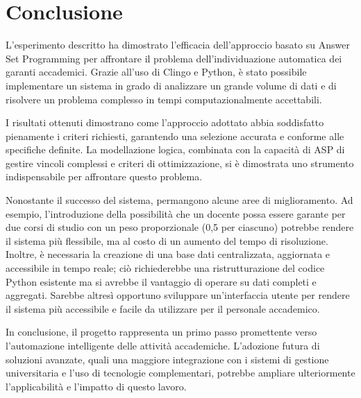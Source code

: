 \section{Conclusione}

L'esperimento descritto ha dimostrato l'efficacia dell'approccio basato su
Answer Set Programming per affrontare il problema
dell'individuazione automatica dei garanti accademici. Grazie all'uso di
Clingo e Python, è stato possibile implementare un sistema in
grado di analizzare un grande volume di dati e di risolvere un problema
complesso in tempi computazionalmente accettabili.

I risultati ottenuti dimostrano come l'approccio adottato abbia soddisfatto
pienamente i criteri richiesti, garantendo una selezione accurata e conforme
alle specifiche definite. La modellazione logica, combinata con la capacità di
ASP di gestire vincoli complessi e criteri di ottimizzazione, si è dimostrata
uno strumento indispensabile per affrontare questo problema.

Nonostante il successo del sistema, permangono alcune aree di miglioramento. Ad
esempio, l'introduzione della possibilità che un docente possa essere garante
per due corsi di studio con un peso proporzionale (0,5 per ciascuno) potrebbe
rendere il sistema più flessibile, ma al costo di un aumento del tempo di
risoluzione. Inoltre, è necessaria la creazione di una base dati centralizzata,
aggiornata e accessibile in tempo reale; ciò richiederebbe una ristrutturazione
del codice Python esistente ma si avrebbe il vantaggio di operare su dati
completi e aggregati. Sarebbe altresì opportuno sviluppare un'interfaccia utente
per rendere il sistema più accessibile e facile da utilizzare per il personale
accademico.

In conclusione, il progetto rappresenta un primo passo promettente verso
l'automazione intelligente delle attività accademiche. L'adozione futura di
soluzioni avanzate, quali una maggiore integrazione con i sistemi di gestione
universitaria e l'uso di tecnologie complementari, potrebbe ampliare
ulteriormente l'applicabilità e l'impatto di questo lavoro.
